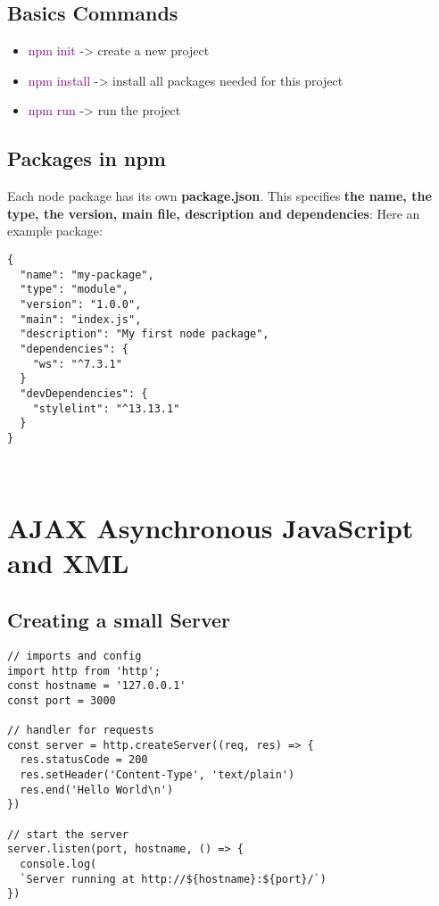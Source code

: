 \documentclass[main.tex,fontsize=6pt,paper=a4,paper=landscape,DIV=calc,]{scrartcl}
\begin{document}
\begin{multicols*}{4}
\subsection{Basics Commands}  
\begin{itemize}
\item \textcolor{purple}{npm init} -> create a new project
\item \textcolor{purple}{npm install} -> install all packages needed for this project
\item \textcolor{purple}{npm run} -> run the project
\end{itemize} 

\subsection{Packages in npm}  
Each node package has its own \textbf{package.json}.\newline
This specifies \textbf{the name, the type, the version, main file, description and dependencies}:\newline
Here an example package:\newline
\begin{lstlisting}
{
  "name": "my-package",
  "type": "module",
  "version": "1.0.0",
  "main": "index.js",
  "description": "My first node package",
  "dependencies": {
    "ws": "^7.3.1"
  }
  "devDependencies": {
    "stylelint": "^13.13.1"
  }
}
\end{lstlisting}
\, \newline

\section{AJAX Asynchronous JavaScript and XML}

\subsection{Creating a small Server}  
\begin{lstlisting}
// imports and config
import http from 'http';
const hostname = '127.0.0.1'
const port = 3000

// handler for requests
const server = http.createServer((req, res) => {
  res.statusCode = 200
  res.setHeader('Content-Type', 'text/plain')
  res.end('Hello World\n')
})

// start the server
server.listen(port, hostname, () => {
  console.log(
  `Server running at http://${hostname}:${port}/`)
})
\end{lstlisting}
\, \newline


\end{multicols*}
\end{document}
